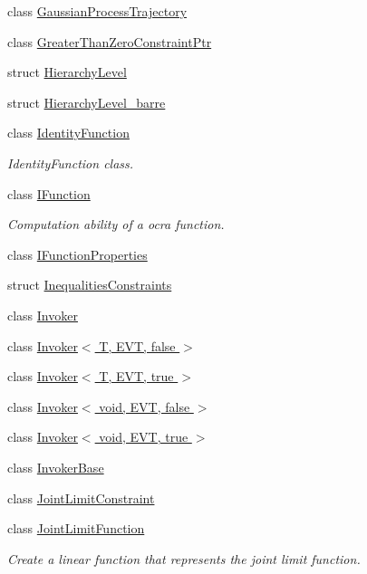 \begin{DoxyCompactItemize}
class \hyperlink{classocra_1_1GaussianProcessTrajectory}{Gaussian\+Process\+Trajectory}
\item 
class \hyperlink{classocra_1_1GreaterThanZeroConstraintPtr}{Greater\+Than\+Zero\+Constraint\+Ptr}
\item 
struct \hyperlink{structocra_1_1HierarchyLevel}{Hierarchy\+Level}
\item 
struct \hyperlink{structocra_1_1HierarchyLevel__barre}{Hierarchy\+Level\+\_\+barre}
\item 
class \hyperlink{classocra_1_1IdentityFunction}{Identity\+Function}
\begin{DoxyCompactList}\small\item\em Identity\+Function class. \end{DoxyCompactList}\item 
class \hyperlink{classocra_1_1IFunction}{I\+Function}
\begin{DoxyCompactList}\small\item\em Computation ability of a ocra function. \end{DoxyCompactList}\item 
class \hyperlink{classocra_1_1IFunctionProperties}{I\+Function\+Properties}
\item 
struct \hyperlink{structocra_1_1InequalitiesConstraints}{Inequalities\+Constraints}
\item 
class \hyperlink{classocra_1_1Invoker}{Invoker}
\item 
class \hyperlink{classocra_1_1Invoker_3_01T_00_01EVT_00_01false_01_4}{Invoker$<$ T, E\+V\+T, false $>$}
\item 
class \hyperlink{classocra_1_1Invoker_3_01T_00_01EVT_00_01true_01_4}{Invoker$<$ T, E\+V\+T, true $>$}
\item 
class \hyperlink{classocra_1_1Invoker_3_01void_00_01EVT_00_01false_01_4}{Invoker$<$ void, E\+V\+T, false $>$}
\item 
class \hyperlink{classocra_1_1Invoker_3_01void_00_01EVT_00_01true_01_4}{Invoker$<$ void, E\+V\+T, true $>$}
\item 
class \hyperlink{classocra_1_1InvokerBase}{Invoker\+Base}
\item 
class \hyperlink{classocra_1_1JointLimitConstraint}{Joint\+Limit\+Constraint}
\item 
class \hyperlink{classocra_1_1JointLimitFunction}{Joint\+Limit\+Function}
\begin{DoxyCompactList}\small\item\em Create a linear function that represents the joint limit function. \end{DoxyCompactList}\item 

\end{DoxyCompactItemize}
